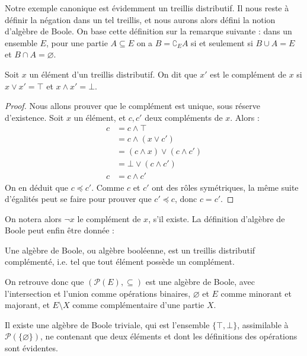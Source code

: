 Notre exemple canonique est évidemment un treillis distributif. Il nous reste à définir la négation dans un tel treillis, et nous aurons alors défini la notion d'algèbre de Boole. On base cette définition sur la remarque suivante : dans un ensemble $E$, pour une partie $A\subseteq E$ on a $B = \complement_E A$ si et seulement si $B\cup A = E$ et $B\cap A = \varnothing$.

\begin{defi}[Complément]
    Soit $x$ un élément d'un treillis distributif. On dit que $x'$ est le complément de $x$ si $x\lor x' = \top$ et $x\land x' = \bot$.
\end{defi}

\begin{proof}
    Nous allons prouver que le complément est unique, sous réserve d'existence. Soit $x$ un élément, et $c,c'$ deux compléments de $x$. Alors :
    \begin{align*}
        c &= c\wedge \top\\
        &= c\wedge (x\vee c')\\
        &= (c\wedge x) \vee (c\wedge c')\\
        &= \bot \vee (c\wedge c')\\
        c &= c\wedge c'
    \end{align*}
    On en déduit que $c\preceq c'$. Comme $c$ et $c'$ ont des rôles symétriques, la même suite d'égalités peut se faire pour prouver que $c'\preceq c$, donc $c=c'$.
\end{proof}

On notera alors $\lnot x$ le complément de $x$, s'il existe. La définition d'algèbre de Boole peut enfin être donnée :

\begin{defi}
    Une algèbre de Boole, ou algèbre booléenne, est un treillis distributif complémenté, i.e. tel que tout élément possède un complément.
\end{defi}

\begin{expl}
    On retrouve donc que $(\mathcal P(E),\subseteq)$ est une algèbre de Boole, avec l'intersection et l'union comme opérations binaires, $\varnothing$ et $E$ comme minorant et majorant, et $E\setminus X$ comme complémentaire d'une partie $X$.
\end{expl}

\begin{rmk}
    Il existe une algèbre de Boole triviale, qui est l'ensemble $\{\top,\bot\}$, assimilable à $\mathcal P(\{\varnothing\})$, ne contenant que deux éléments et dont les définitions des opérations sont évidentes.
\end{rmk}

